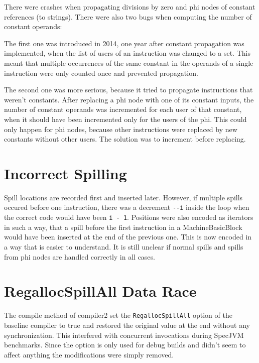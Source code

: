 \documentclass[draft,final]{vutinfth} %
\begin{document}
    There were crashes when propagating divisions by zero and phi nodes of constant references (to strings).
    There were also two bugs when computing the number of constant operands:

    The first one was introduced in 2014, one year after constant propagation was implemented,
    when the list of users of an instruction was changed to a set.
    This meant that multiple occurrences of the same constant in the operands of a single instruction
    were only counted once and prevented propagation.

    The second one was more serious, because it tried to propagate instructions that weren't constants.
    After replacing a phi node with one of its constant inputs,
    the number of constant operands was incremented for each user of that constant,
    when it should have been incremented only for the users of the phi.
    This could only happen for phi nodes, because other instructions were replaced by new constants without other users.
    The solution was to increment before replacing.


    \section{Incorrect Spilling}

    Spill locations are recorded first and inserted later.
    However, if multiple spills occured before one instruction,
    there was a decrement \lstinline{--i} inside the loop when the correct code would have been \lstinline{i - 1}.
    Positions were also encoded as iterators in such a way, that a spill before the first instruction in a MachineBasicBlock
    would have been inserted at the end of the previous one. This is now encoded in a way that is easier to understand.
    It is still unclear if normal spills and spills from phi nodes are handled correctly in all cases.


    \section{RegallocSpillAll Data Race}

    The compile method of compiler2 set the \lstinline{RegallocSpillAll}
    option of the baseline compiler to true and restored the original value at the end without any synchronization.
    This interfered with concurrent invocations during SpecJVM benchmarks.
    Since the option is only used for debug builds and didn't seem to affect anything
    the modifications were simply removed.
\end{document}
